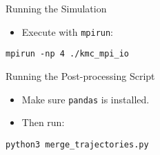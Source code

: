 \documentclass{beamer}
\begin{document}
\begin{frame}[fragile]{Running the Simulation}
\begin{itemize}
  \item Execute with \texttt{mpirun}:
\end{itemize}
\begin{minipage}{\linewidth}\begin{lstlisting}
mpirun -np 4 ./kmc_mpi_io
\end{lstlisting}\end{minipage}
\end{frame}

\begin{frame}[fragile]{Running the Post-processing Script}
\begin{itemize}
  \item Make sure \texttt{pandas} is installed.
  \item Then run:
\end{itemize}
\begin{minipage}{\linewidth}\begin{lstlisting}
python3 merge_trajectories.py
\end{lstlisting}\end{minipage}
\end{frame}
\end{document}
